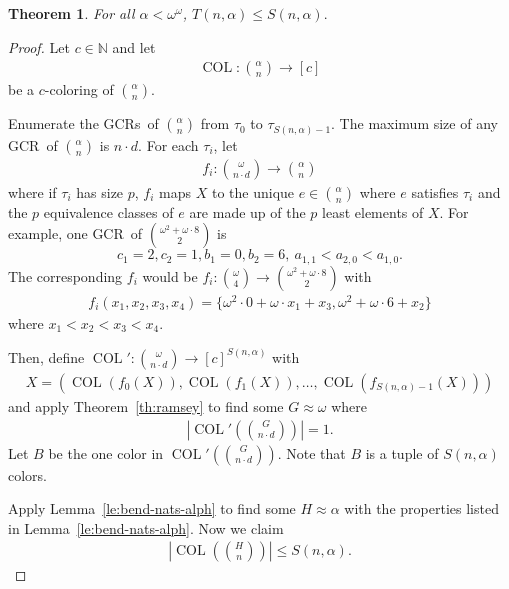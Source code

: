 \documentclass[11pt]{article}
\newcommand{\om}{\omega}
\newcommand{\oequiv}{\approx}
\newcommand{\COL}{\operatorname{COL}}
\newcommand{\N}{\mathbb{N}}
\newcommand{\gencrulenospace}{GCR}
\newcommand{\gencrule}{\gencrulenospace~}
\newcommand{\gencrules}{\gencrulenospace s~}
\newcommand{\numpoints}{n}
\newcommand{\numcolors}{c}
\newcommand{\commonconst}{a}
\newcommand{\rareconst}{b}
\newcommand{\Rareconst}{B}
\theoremstyle{plain}
\newtheorem{theorem}{Theorem}[section]
\theoremstyle{definition}
\begin{document}
\begin{theorem}
    \label{th:alph-GT}
    For all $\alpha < \om^\om$,
        $T\left(\numpoints, \alpha\right) \leq S\left(\numpoints, \alpha\right).$
\end{theorem}
\begin{proof}
Let $\numcolors \in \N$ and let \begin{align*}
    \COL \colon \binom{\alpha}{\numpoints} \to [\numcolors]
\end{align*}
be a $\numcolors$-coloring of $\binom{\alpha}{\numpoints}$.

Enumerate the \gencrules of $\binom{\alpha}{\numpoints}$ from $\tau_0$ to $\tau_{S(\numpoints, \alpha)-1}$. The maximum size of any \gencrule of $\binom{\alpha}{\numpoints}$ is $\numpoints \cdot d$. For each $\tau_i$, let \begin{align*}
    f_i \colon \binom{\om}{\numpoints \cdot d} \to \binom{\alpha}{\numpoints}
\end{align*}
where if $\tau_i$ has size $p$, $f_i$ maps $X$ to the unique $e \in \binom{\alpha}{\numpoints}$
where $e$ satisfies $\tau_i$ and the $p$ equivalence classes of $e$ are made up of the $p$ least elements of $X$. For example, one \gencrule of $\binom{\om^2 + \om\cdot 8}{2}$ is $$
c_1=2,c_2=1,\rareconst_1=0,\rareconst_2=6,~\commonconst_{1, 1} < \commonconst_{2, 0} < \commonconst_{1, 0}.
$$ The corresponding $f_i$ would be $f_i \colon \binom{\om}{4} \to \binom{\om^2 + \om\cdot 8}{2}$ with \begin{align*}
f_i(x_1,x_2,x_3,x_4) = \{\om^2 \cdot 0 + \om \cdot x_1 + x_3, \om^2 + \om \cdot 6 + x_2\}
\end{align*} where $x_1 < x_2 < x_3 < x_4$.

Then, define $\COL' \colon \binom{\om}{\numpoints \cdot d} \to [\numcolors]^{S(\numpoints, \alpha)}$ with \begin{align*}
    X = (\COL(f_0(X)),\COL(f_1(X)),\ldots,\COL(f_{S(\numpoints, \alpha)-1}(X)))
\end{align*}
and apply Theorem~\ref{th:ramsey} to find some $G \oequiv \om$ where
\begin{align*}
\left | \COL' \left( \binom{G}{\numpoints \cdot d} \right)\right | = 1.
\end{align*}
Let $\Rareconst$ be the one color in $\COL'\left(\binom{G}{\numpoints\cdot d}\right)$.
Note that $\Rareconst$ is a tuple of $S(\numpoints, \alpha)$ colors.

Apply Lemma~\ref{le:bend-nats-alph} to find some
$H \oequiv \alpha$ with the properties listed in Lemma~\ref{le:bend-nats-alph}. Now we claim 
\begin{align*}
    \left | \COL \left( \binom{H}{\numpoints} \right)\right | \leq 
S(\numpoints, \alpha).
\end{align*}


\end{proof}
\end{document}
